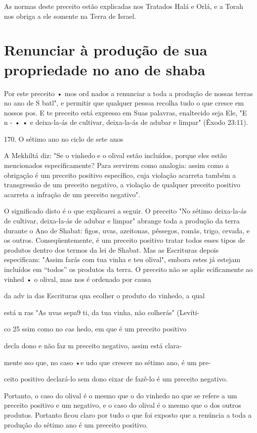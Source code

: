 As normas deste preceito estão explicadas nos Tratados Halá e Orlá, e a
Torah nos obriga a ele somente na Terra de Israel.

\section{Renunciar à produção de sua propriedade no ano de shaba}

Por este preceito • mos ord nados a renunciar a toda a produção de
nossas terras no ano de S batl", e permitir que qualquer pessoa recolha
tudo o que cresce em nossos pos. E te preceito está expresso em Suas
pala­vras, enaltecido seja Ele, "E n - • • e deixa-la-ás de cultivar,
deixa-la-ás de adu­bar e limpar" (Êxodo 23:11).

170. O sétimo ano no ciclo de sete anos

A Mekhiltá diz: "Se o vinhedo e o olival estão incluídos, porque eles
estão mencionados especificamente? Para servirem como analogia: assim
co­mo a obrigação é um preceito positivo específico, cuja violação
acarreta tam­bém a transgressão de um preceito negativo, a violação de
qualquer preceito positivo acarreta a infração de um preceito negativo".

O significado disto é o que explicarei a seguir. O preceito "No séti­mo
deixa-la-ás de cultivar, deixa-la-ás de adubar e limpar" abrange toda a
pro­dução da terra durante o Ano de Shabat: figos, uvas, azeitonas,
pêssegos, ro­mãs, trigo, cevada, e os outros. Conseqüentemente, é um
preceito positivo tra­tar todos esses tipos de produtos dentro dos
termos da lei de Shabat. Mas as Escrituras depois especificam: "Assim
farás com tua vinha e teu olival", embo­ra estes já estejam incluídos em
``todos'' os produtos da terra. O preceito não se aplic ecificamente ao
vinhed • o olival, mas nos é ordenado por causa

da adv ia das Escrituras qua ecolher o produto do vinhedo, a qual

está n ras "As uvas sepa9 ti, da tua vinha, não colherás" (Levíti-

co 25 ssim como no cas hedo, em que é um preceito positivo

decla dono e não faz m preceito negativo, assim está clara-

mente sso que, no caso •e udo que crescer no sétimo ano, é um pre-

ceito positivo declará-lo sem dono eixar de fazê-lo é um preceito
negativo.

Portanto, o caso do olival é o mesmo que o do vinhedo no que se refere a
um preceito positivo e um negativo, e o caso do olival é o mesmo que o
dos outros produtos. Portanto ficou claro por tudo o que foi exposto que
a renúncia a toda a produção do sétimo ano é um preceito positivo.

